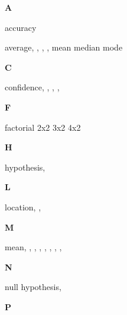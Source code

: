 \begin{theindex}

{\Large\textbf
A
}\hfill\nopagebreak

  \item accuracy\dotfill {}
  \item average\dotfill {}, , , 
		, 
    \subitem mean\dotfill {}
    \subitem median\dotfill {}
    \subitem mode\dotfill {}

  \indexspace

{\Large\textbf
C
}\hfill\nopagebreak

  \item confidence\dotfill {}, , 
		, , 

  \indexspace

{\Large\textbf
F
}\hfill\nopagebreak

  \item factorial
    \subitem 2x2\dotfill {}
    \subitem 3x2\dotfill {}
    \subitem 4x2\dotfill {}

  \indexspace

{\Large\textbf
H
}\hfill\nopagebreak

  \item hypothesis\dotfill {}, 

  \indexspace

{\Large\textbf
L
}\hfill\nopagebreak

  \item location\dotfill {}, , 

  \indexspace

{\Large\textbf
M
}\hfill\nopagebreak

  \item mean\dotfill {}, , , 
		, , , 
		, , 

  \indexspace

{\Large\textbf
N
}\hfill\nopagebreak

  \item null hypothesis\dotfill {}, 

  \indexspace

{\Large\textbf
P
}\hfill\nopagebreak


\end{theindex}
